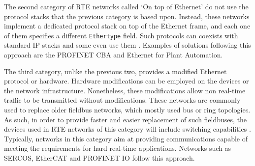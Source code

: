 The second category of RTE networks called `On top of Ethernet' do not use the protocol stacks that the previous category is based upon.
Instead, these networks implement a dedicated protocol stack on top of the Ethernet frame, and each one of them specifies a different \verb|Ethertype| field.
Such protocols can coexists with standard IP stacks and some even use them \cite{rte:rte-for-automation}.
Examples of solutions following this approach are the PROFINET CBA and Ethernet for Plant Automation.

The third category, unlike the previous two, provides a modified Ethernet protocol or hardware.
Hardware modifications can be employed on the devices or the network infrastructure.
Nonetheless, these modifications allow non real-time traffic to be transmitted without modifications.
These networks are commonly used to replace older fieldbus networks, which mostly used bus or ring topologies.
As such, in order to provide faster and easier replacement of such fieldbuses, the devices used in RTE networks of this category will include switching capabilities \cite{rte:rte-for-automation}.
Typically, networks in this category aim at providing communications capable of meeting the requirements for hard real-time applications.
Networks such as SERCOS, EtherCAT \cite{protocol:ethercat} and PROFINET IO \cite{protocol:profinet} follow this approach.
